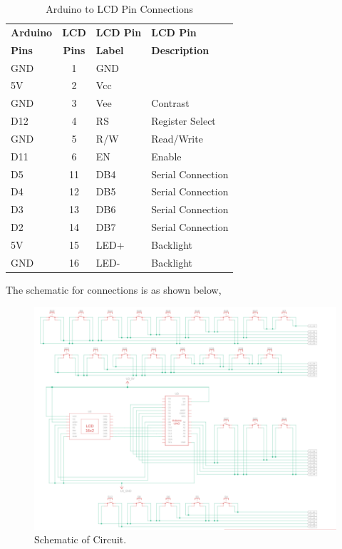 \documentclass[a4paper,12pt]{article}
\begin{document}
\begin{table}[htbp]
    \centering
    \label{tab:arduino-lcd}
    \begin{tabular}{|l|c|l|l|}
        \hline
        \textbf{Arduino} & \textbf{LCD} & \textbf{LCD Pin} & \textbf{LCD Pin} \\
        \textbf{Pins} & \textbf{Pins} & \textbf{Label} & \textbf{Description} \\
        \hline
        GND & 1 & GND & \\
        \hline
        5V & 2 & Vcc & \\
        \hline
        GND & 3 & Vee & Contrast \\
        \hline
        D12 & 4 & RS & Register Select \\
        \hline
        GND & 5 & R/W & Read/Write \\
        \hline
        D11 & 6 & EN & Enable \\
        \hline
        D5 & 11 & DB4 & Serial Connection \\
        \hline
        D4 & 12 & DB5 & Serial Connection \\
        \hline
        D3 & 13 & DB6 & Serial Connection \\
        \hline
        D2 & 14 & DB7 & Serial Connection \\
        \hline
        5V & 15 & LED+ & Backlight \\
        \hline
        GND & 16 & LED- & Backlight \\
        \hline
    \end{tabular}
    \caption{Arduino to LCD Pin Connections}
\end{table}
\FloatBarrier

The schematic for connections is as shown below,
\begin{figure}[H]
    \centering
    \includegraphics[width=\textwidth]{./figs/schematic.png}
    \caption{Schematic of Circuit.}
    \label{fig:circuit_schematic}
\end{figure}
\end{document}
